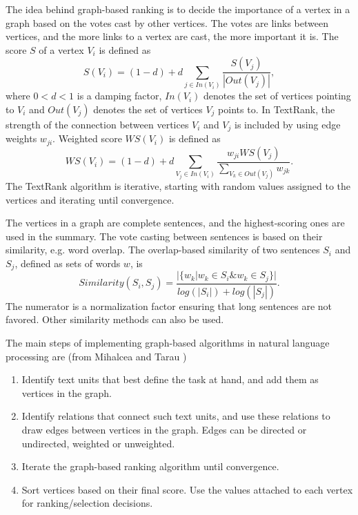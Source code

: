 \documentclass[conference]{IEEEtran}
\begin{document}
The idea behind graph-based ranking is to decide the importance of a vertex in a graph based on the votes cast by other vertices. The votes are links between vertices, and the more links to a vertex are cast, the more important it is. The score $S$ of a vertex $V_i$ is defined as \cite{brin1998}
\begin{equation}
S(V_i) = (1-d)+d \sum \limits_{j \in In(V_i)} \frac{S(V_j)}{|Out(V_j)|},
\end{equation}
where $0 < d < 1$ is a damping factor, $In(V_i)$ denotes the set of vertices pointing to $V_i$ and $Out(V_j)$ denotes the set of vertices $V_j$ points to. In TextRank, the strength of the connection between vertices $V_i$ and $V_j$ is included by using edge weights $w_{ji}$. Weighted score $WS(V_i)$ is defined as
\begin{equation}
WS(V_i) = (1-d) + d \sum \limits_{V_j \in In(V_i)} \frac{w_{ji} WS(V_j)}{\sum \limits_{V_k \in Out(V_j)}w_{jk}}.
\end{equation}
The TextRank algorithm is iterative, starting with random values assigned to the vertices and iterating until convergence.

The vertices in a graph are complete sentences, and the highest-scoring ones are used in the summary. The vote casting between sentences is based on their similarity, e.g. word overlap. The overlap-based similarity of two sentences $S_i$ and $S_j$, defined as sets of words $w$, is \cite{mihalcea2004}
\begin{equation}
Similarity(S_i,S_j) = \frac{|\{w_k|w_k \in S_i \& w_k \in S_j\}|}{log(|S_i|)+log(|S_j|)}.
\end{equation}
The numerator is a normalization factor ensuring that long sentences are not favored. Other similarity methods can also be used.

The main steps of implementing graph-based algorithms in natural language processing are (from Mihalcea and Tarau \cite{mihalcea2004})
\begin{enumerate}
	\item Identify text units that best define the task at hand,
	and add them as vertices in the graph.
	\item Identify relations that connect such text units, and
	use these relations to draw edges between vertices
	in the graph. Edges can be directed or undirected,
	weighted or unweighted.
	\item Iterate the graph-based ranking algorithm until convergence.
	\item Sort vertices based on their final score. Use the values
	attached to each vertex for ranking/selection decisions.
\end{enumerate}
\end{document}
